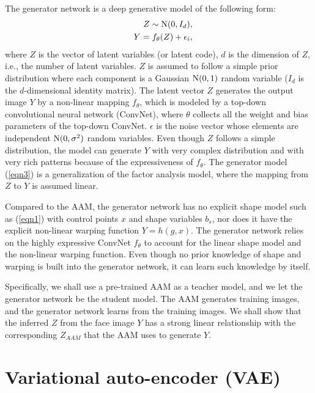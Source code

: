 \documentclass{article}
\begin{document}
The generator network is a deep generative model of the following form: 
\begin{eqnarray}
\label{eqn3}
&&Z \sim {\rm N}(0, I_d), \\
 && Y = f_\theta(Z) + \epsilon_i, 
\end{eqnarray}
where $Z$ is the vector of latent variables (or latent code), $d$ is the dimension of $Z$, i.e., the number of latent variables. $Z$ is assumed to follow a simple prior distribution where each component is a Gaussian ${\rm N}(0, 1)$ random variable ($I_d$ is the $d$-dimensional identity matrix). The latent vector $Z$ generates the output image $Y$ by a non-linear mapping $f_\theta$, which is modeled by a top-down convolutional neural network (ConvNet), where $\theta$ collects all the weight and bias parameters of the top-down ConvNet. $\epsilon$ is the noise vector whose elements are independent ${\rm N}(0, \sigma^2)$ random variables. Even though $Z$ follows a simple distribution, the model can generate $Y$ with very complex distribution and with very rich patterns because of the expressiveness of $f_\theta$. The generator model (\ref{eqn3}) is a generalization of the factor analysis model, where the mapping from $Z$ to $Y$ is assumed linear. 

Compared to the AAM, the generator network has no explicit shape model such as (\ref{eqn1}) with control points $x$ and shape variables $b_s$, nor does it have the explicit non-linear  warping function $Y = h(g, x)$. The generator network relies on the highly expressive ConvNet $f_\theta$ to account for the linear shape model and the non-linear warping function. Even though no prior knowledge of shape and warping is built into the generator network, it can learn such knowledge by itself. 

Specifically, we shall use a pre-trained AAM as a teacher model, and we let the generator network be the student model. The AAM generates training images, and the generator network learns from the training images. We shall show that the inferred $Z$ from the face image $Y$ has a strong linear relationship with the corresponding $Z_{AAM}$ that the AAM uses to generate $Y$. 

\section{Variational auto-encoder (VAE)} 
\end{document}
